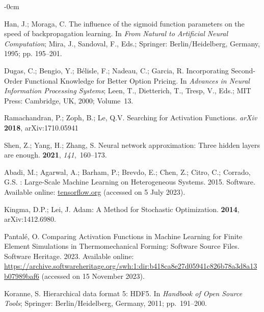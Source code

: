 \documentclass[algorithms,article,accept,pdftex,oneauthor]{Definitions/mdpi}
\begin{document}
\begin{adjustwidth}{-\extralength}{0cm}
\begin{thebibliography}{999}
Han, J.; Moraga, C.
\newblock The influence of the sigmoid function parameters on the speed of
backpropagation learning.
\newblock In \emph{From Natural to Artificial Neural Computation};
Mira, J., Sandoval, F., Eds.; Springer: Berlin/Heidelberg, 
Germany, 1995; pp. 195--201.

Dugas, C.; Bengio, Y.; B\'{e}lisle, F.; Nadeau, C.; Garcia, R.
\newblock Incorporating Second-Order Functional Knowledge for Better Option
Pricing.
\newblock In \emph{Advances in Neural Information Processing
Systems}; Leen, T., Dietterich, T., Tresp, V., Eds.; MIT Press: Cambridge, UK,  
2000; Volume~13.

Ramachandran, P.; Zoph, B.; Le, Q.V.
\newblock Searching for Activation Functions. \emph{arXiv} \textbf{2018}, arXiv:1710.05941 

Shen, Z.; Yang, H.; Zhang, S.
\newblock Neural network approximation: Three hidden layers are enough.
 {\bf 2021}, {\em 141},~160--173.

Abadi, M.; Agarwal, A.; Barham, P.; Brevdo, E.; Chen, Z.; Citro, C.; Corrado,
G.S.
: Large-Scale Machine Learning on Heterogeneous Systems.
2015.
\newblock Software.  Available online: \url{tensorflow.org}  (accessed on 5 July 2023). 


Kingma, D.P.; Lei, J.
\newblock Adam:  A Method  for  Stochastic Optimization.
 {\bf 2014},  
arXiv:1412.6980. 

Pantalé, O.
\newblock Comparing Activation Functions in Machine Learning for Finite Element
Simulations in Thermomechanical Forming: Software Source Files.
\newblock Software Heritage.  2023.
\newblock Available online: \url{https://archive.softwareheritage.org/swh:1:dir:b418ca8e27d05941c826b78a3d8a13b07989baf6} (accessed on 15 November 2023). 

Koranne, S.
\newblock Hierarchical data format 5: HDF5. In {\em Handbook of Open Source
Tools}; Springer:  Berlin/Heidelberg, Germany, 
2011; pp.~191--200.


\end{thebibliography}
\end{adjustwidth}
\end{document}
